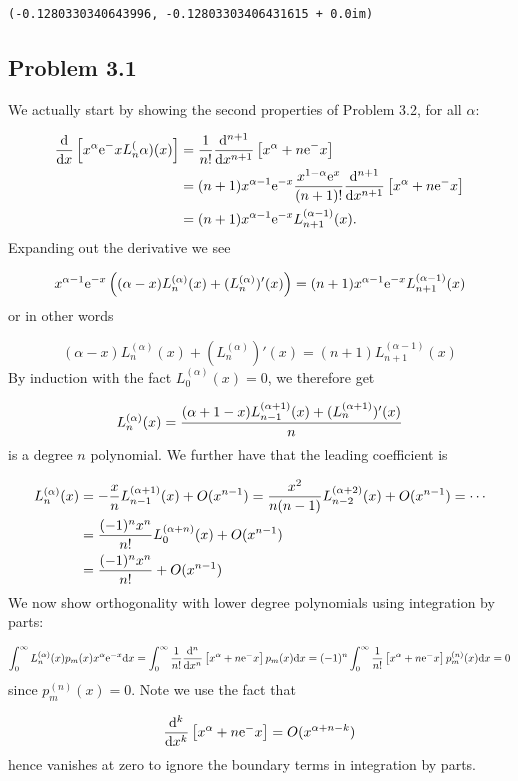 \documentclass[12pt,a4paper]{article}
\def\D{ {\rm d} }
\def\E{ {\rm e} }
\def\addtab#1={#1\;&=}
\def\ccr{\\\addtab}
\def\dx{\D x}
\def\pr(#1){\left({#1}\right)}
\def\br[#1]{\left[{#1}\right]}
\def\addtab#1={#1\;&=}
\def\ccr{\\\addtab}
\begin{document}
\begin{lstlisting}
(-0.1280330340643996, -0.12803303406431615 + 0.0im)
\end{lstlisting}


\subsection{Problem 3.1}
We actually start by showing the second properties of Problem 3.2, for all $\alpha$:


\begin{align*}
{\D \over \dx} \br[x^\alpha \E^{-x} L_n^{(\alpha)}(x)] &= {1 \over n!}  {\D^{n+1} \over \dx^{n+1}}\br[x^{\alpha+n}\E^{-x}] \ccr
= (n+1)x^{\alpha-1}\E^{-x}  {x^{1-\alpha} \E^{x} \over (n+1)!}{ \D^{n+1} \over \dx^{n+1}}\br[x^{\alpha+n}\E^{-x}] \ccr
= (n+1) x^{\alpha-1}\E^{-x} L_{n+1}^{(\alpha-1)}(x).
\end{align*}
Expanding out the derivative we see

\[
x^{\alpha-1} \E^{-x}\pr({(\alpha -x)L_n^{(\alpha)}(x) + (L_n^{(\alpha)})'(x)}) = (n+1) x^{\alpha-1}\E^{-x} L_{n+1}^{(\alpha-1)}(x)
\]
or in other words

\[
(\alpha -x)L_n^{(\alpha)}(x) + (L_n^{(\alpha)})'(x) = (n+1) L_{n+1}^{(\alpha-1)}(x)
\]
By induction with the fact $L_0^{(\alpha)}(x) = 0$, we therefore get 

\[
L_n^{(\alpha)}(x) = {(\alpha+1 -x)L_{n-1}^{(\alpha+1)}(x) + (L_n^{(\alpha+1)})'(x) \over n}
\]
is a degree $n$ polynomial. We further have that the leading coefficient is


\begin{align*}
L_n^{(\alpha)}(x) &= -{x \over n} L_{n-1}^{(\alpha+1)}(x) +O(x^{n-1}) =   {x^2 \over n(n-1)} L_{n-2}^{(\alpha+2)}(x) +O(x^{n-1}) = \cdots \ccr
= {(-1)^n x^n \over n!} L_0^{(\alpha+n)}(x) +O(x^{n-1}) \\
&= {(-1)^n x^n \over n!} +O(x^{n-1})
\end{align*}
We now show orthogonality with lower degree polynomials using integration by parts:

\[
\int_0^\infty L_n^{(\alpha)}(x) p_m(x) x^\alpha \E^{-x} \dx = 
\int_0^\infty  {1 \over n!} {\D^n \over \dx^n}\br[x^{\alpha+n}\E^{-x}]  p_m(x)  \dx = (-1)^n \int_0^\infty  {1 \over n!} \br[x^{\alpha+n}\E^{-x}]  p_m^{(n)}(x)  \dx = 0
\]
since $p_m^{(n)}(x) = 0$. Note we use the fact that

\[
{\D^k \over \dx^k}\br[x^{\alpha+n}\E^{-x}]  = O(x^{\alpha+n-k})
\]
hence vanishes at zero to ignore the boundary terms in integration by parts.
\end{document}
